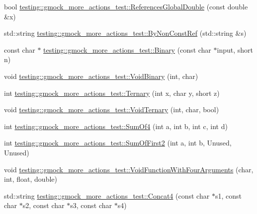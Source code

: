 \begin{DoxyCompactItemize}
\item 
bool \mbox{\hyperlink{namespacetesting_1_1gmock__more__actions__test_ae2d3dddc96f5657127593f129cd3fc51}{testing\+::gmock\+\_\+more\+\_\+actions\+\_\+test\+::\+References\+Global\+Double}} (const double \&x)
\item 
std\+::string \mbox{\hyperlink{namespacetesting_1_1gmock__more__actions__test_acfdfdaebbbbfc2f9129f29b10cb42eee}{testing\+::gmock\+\_\+more\+\_\+actions\+\_\+test\+::\+By\+Non\+Const\+Ref}} (std\+::string \&s)
\item 
const char $\ast$ \mbox{\hyperlink{namespacetesting_1_1gmock__more__actions__test_a853c9f048674a60798b930750b74a1df}{testing\+::gmock\+\_\+more\+\_\+actions\+\_\+test\+::\+Binary}} (const char $\ast$input, short n)
\item 
void \mbox{\hyperlink{namespacetesting_1_1gmock__more__actions__test_aec71bd163ae67ec97e073bd13a4ac039}{testing\+::gmock\+\_\+more\+\_\+actions\+\_\+test\+::\+Void\+Binary}} (int, char)
\item 
int \mbox{\hyperlink{namespacetesting_1_1gmock__more__actions__test_ab98b352528a0b72625b4710a6fc648a1}{testing\+::gmock\+\_\+more\+\_\+actions\+\_\+test\+::\+Ternary}} (int x, char y, short z)
\item 
void \mbox{\hyperlink{namespacetesting_1_1gmock__more__actions__test_ac41b49dc8ab365ccad7b332796421cd4}{testing\+::gmock\+\_\+more\+\_\+actions\+\_\+test\+::\+Void\+Ternary}} (int, char, bool)
\item 
int \mbox{\hyperlink{namespacetesting_1_1gmock__more__actions__test_a41c348fff8608825239a276b8426a475}{testing\+::gmock\+\_\+more\+\_\+actions\+\_\+test\+::\+Sum\+Of4}} (int a, int b, int c, int d)
\item 
int \mbox{\hyperlink{namespacetesting_1_1gmock__more__actions__test_aaa60ddffb96ddc3a73b0b22929ca5bec}{testing\+::gmock\+\_\+more\+\_\+actions\+\_\+test\+::\+Sum\+Of\+First2}} (int a, int b, Unused, Unused)
\item 
void \mbox{\hyperlink{namespacetesting_1_1gmock__more__actions__test_a8c952be61635486e84c1eca3bf3acd9b}{testing\+::gmock\+\_\+more\+\_\+actions\+\_\+test\+::\+Void\+Function\+With\+Four\+Arguments}} (char, int, float, double)
\item 
std\+::string \mbox{\hyperlink{namespacetesting_1_1gmock__more__actions__test_a753ab28ecaa4133f11f9e34441b04595}{testing\+::gmock\+\_\+more\+\_\+actions\+\_\+test\+::\+Concat4}} (const char $\ast$s1, const char $\ast$s2, const char $\ast$s3, const char $\ast$s4)
\item 

\end{DoxyCompactItemize}
